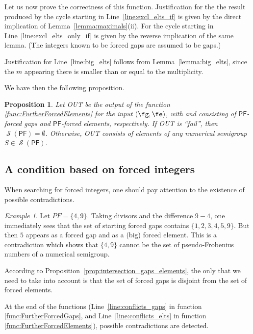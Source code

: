\documentclass[11pt]{amsart}
\newtheorem{proposition}[theorem]{Proposition}
\theoremstyle{remark}
\newtheorem{example}[theorem]{Example}
\begin{document}
Let us now prove the correctness of this function. Justification for the the result produced by the cycle starting in Line~\ref{line:excl_elts_if} is given by the direct implication of Lemma~\ref{lemma:maximals}(ii). For the cycle starting in Line~\ref{line:excl_elts_only_if} is given by the reverse implication of the same lemma.
 (The integers known to be forced gaps are assumed to be gaps.)

Justification for Line~\ref{line:big_elts} follows from Lemma~\ref{lemma:big_elts}, since the $m$ appearing there is smaller than or equal to the multiplicity. 

We have then the following proposition.
\begin{proposition}\label{prop:correction_FurtherForcedElements}
Let \textsf{OUT} be the output of the function \ref{func:FurtherForcedElements} for the input  $(\fg,\fe)$, with \fg and \fe consisting of {\ensuremath{\mathsf{PF}}}-forced gaps and {\ensuremath{\mathsf{PF}}}-forced elements, respectively. If \textsf{OUT} is ``fail'', then $\operatorname{\mathcal{S}}({\ensuremath{\mathsf{PF}}})=\emptyset$. Otherwise, \textsf{OUT} consists of elements of any numerical semigroup $S\in \operatorname{\mathcal{S}}({\ensuremath{\mathsf{PF}}})$.
\end{proposition}

\subsection{A condition based on forced integers}
\label{subsec:condition_based_on_forced_integers}
When searching for forced integers, one should pay attention to the existence of possible contradictions.
\begin{example}
Let $PF=\{4,9\}$. Taking divisors and the difference $9-4$, one immediately sees that the set of starting forced gaps contains $\{1, 2, 3, 4, 5, 9\}$. But then $5$ appears as a forced gap and as a (big) forced element. This is a contradiction which shows that $\{4,9\}$ cannot be the set of pseudo-Frobenius numbers of a numerical semigroup. 
\end{example}
 According to Proposition~\ref{prop:intersection_gaps_elements}, the only that we need to take into account is that the set of forced gaps is disjoint from the set of forced elements.

At the end of the functions (Line~\ref{line:conflicts_gaps} in function \ref{func:FurtherForcedGaps}, and Line~\ref{line:conflicts_elts} in function \ref{func:FurtherForcedElements}), possible contradictions are detected.
\end{document}
